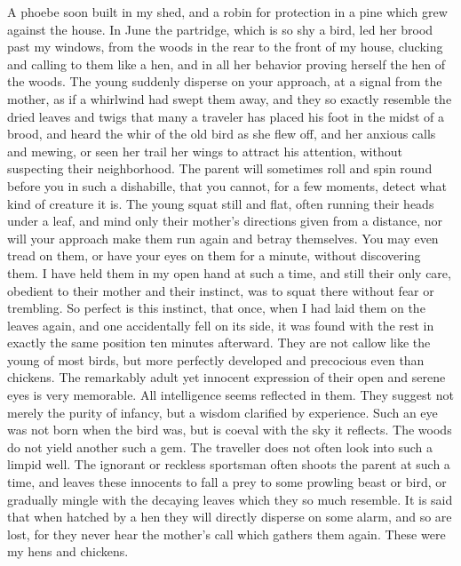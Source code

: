 { 	A phoebe soon built in my shed, and a robin for protection in a pine which grew against the house. In June the partridge, which is so shy a bird, led her brood past my windows, from the woods in the rear to the front of my house, clucking and calling to them like a hen, and in all her behavior proving herself the hen of the woods. The young suddenly disperse on your approach, at a signal from the mother, as if a whirlwind had swept them away, and they so exactly resemble the dried leaves and twigs that many a traveler has placed his foot in the midst of a brood, and heard the whir of the old bird as she flew off, and her anxious calls and mewing, or seen her trail her wings to attract his attention, without suspecting their neighborhood. The parent will sometimes roll and spin round before you in such a dishabille, that you cannot, for a few moments, detect what kind of creature it is. The young squat still and flat, often running their heads under a leaf, and mind only their mother's directions given from a distance, nor will your approach make them run again and betray themselves. You may even tread on them, or have your eyes on them for a minute, without discovering them. I have held them in my open hand at such a time, and still their only care, obedient to their mother and their instinct, was to squat there without fear or trembling. So perfect is this instinct, that once, when I had laid them on the leaves again, and one accidentally fell on its side, it was found with the rest in exactly the same position ten minutes afterward. They are not callow like the young of most birds, but more perfectly developed and precocious even than chickens. The remarkably adult yet innocent expression of their open and serene eyes is very memorable. All intelligence seems reflected in them. They suggest not merely the purity of infancy, but a wisdom clarified by experience. Such an eye was not born when the bird was, but is coeval with the sky it reflects. The woods do not yield another such a gem. The traveller does not often look into such a limpid well. The ignorant or reckless sportsman often shoots the parent at such a time, and leaves these innocents to fall a prey to some prowling beast or bird, or gradually mingle with the decaying leaves which they so much resemble. It is said that when hatched by a hen they will directly disperse on some alarm, and so are lost, for they never hear the mother's call which gathers them again. These were my hens and chickens.

}
